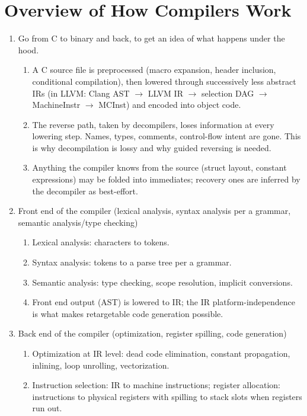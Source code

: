 \documentclass[12pt]{Training}
\begin{document}
\section*{Overview of How Compilers Work}
\begin{enumerate}
    \item Go from C to binary and back, to get an idea of what happens under the hood.
    \begin{enumerate}
        \item A C source file is preprocessed (macro expansion, header inclusion, conditional compilation), then lowered through successively less abstract IRs (in LLVM: Clang AST $\to$ LLVM IR $\to$ selection DAG $\to$ MachineInstr $\to$ MCInst) and encoded into object code.
        \item The reverse path, taken by decompilers, loses information at every lowering step. Names, types, comments, control-flow intent are gone. This is why decompilation is lossy and why guided reversing is needed.
        \item Anything the compiler knows from the source (struct layout, constant expressions) may be folded into immediates; recovery ones are inferred by the decompiler as best-effort.
    \end{enumerate}
    \item Front end of the compiler (lexical analysis, syntax analysis per a grammar, semantic analysis/type checking)
    \begin{enumerate}
        \item Lexical analysis: characters to tokens.
        \item Syntax analysis: tokens to a parse tree per a grammar.
        \item Semantic analysis: type checking, scope resolution, implicit conversions.
        \item Front end output (AST) is lowered to IR; the IR platform-independence is what makes retargetable code generation possible.
    \end{enumerate}
    \item Back end of the compiler (optimization, register spilling, code generation)
    \begin{enumerate}
        \item Optimization at IR level: dead code elimination, constant propagation, inlining, loop unrolling, vectorization.
        \item Instruction selection: IR to machine instructions; register allocation: instructions to physical registers with spilling to stack slots when registers run out.

\end{enumerate}
\end{enumerate}
\end{document}
